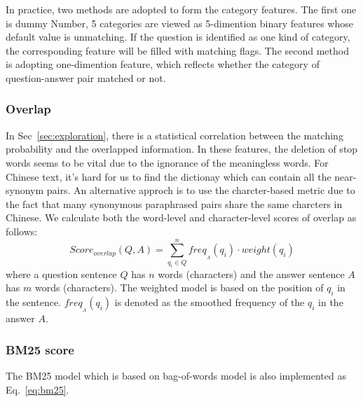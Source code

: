 \documentclass{llncs}
\begin{document}
In practice, two methods are adopted to form the category features. The first one is dummy  Number, 5 categories are viewed as 5-dimention binary features whose default value is unmatching. If the question is identified as one kind of category, the corresponding feature will be filled with matching flags. 
The second method is adopting one-dimention feature, which reflects whether the category of question-answer pair matched or not.


\subsubsection{Overlap}
In Sec~\ref{sec:exploration}, there is a statistical correlation between the matching probability and the overlapped information. 
In these features, the deletion of stop words seems to be vital due to the ignorance of the meaningless words. For Chinese text, it's hard for us to find the dictionay which can contain all the near-synonym pairs. An alternative approch is to use the charcter-based metric due to the fact that many synonymous paraphrased pairs share the same charcters in Chinese. We calculate both the word-level and character-level scores of overlap as follows:
\begin{equation}
Score_{overlap}(Q,A)=\sum_{q_i \in Q}^n freq_{_A}(q_i)\cdot weight(q_i)  
\label{eq:overlap}
\end{equation}
where a question sentence $Q$ has $n$ words (characters) and the answer sentence $A$ has $m$ words (characters). The weighted model is based on the position of $q_i$ in the sentence. %
$freq_{_A}(q_i)$ is denoted as the smoothed frequency of the $q_i$ in the answer $A$.


\subsubsection{BM25 score}
The BM25 model which is based on bag-of-words model is also implemented as Eq.~\ref{eq:bm25}.
\end{document}
